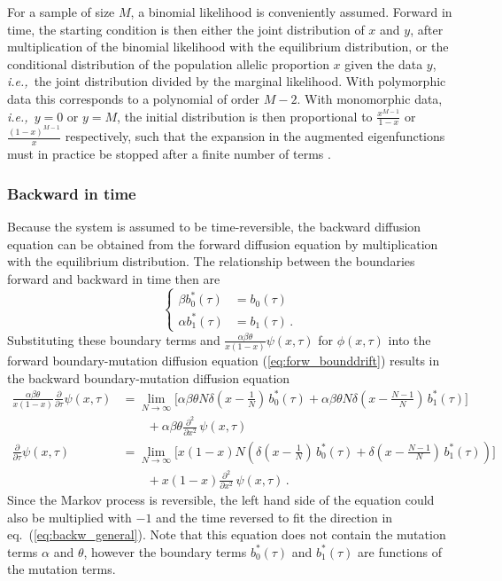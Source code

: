 \documentclass[preprint]{elsarticle}
\newcommand\ie{{\it i.e.,}}
\begin{document}
For a sample of size $M$, a binomial likelihood is conveniently assumed. Forward in time, the starting condition is then either the joint distribution of $x$ and $y$, after multiplication of the binomial likelihood with the equilibrium distribution, or the conditional distribution of the population allelic proportion $x$ given the data $y$, \ie\ the joint distribution divided by the marginal likelihood. With polymorphic data this corresponds to a polynomial of order $M-2$. With monomorphic data, \ie\ $y=0$ or $y=M$, the initial distribution is then proportional to $\frac{x^{M-1}}{1-x}$ or $\frac{(1-x)^{M-1}}{x}$ respectively, such that the expansion in the augmented eigenfunctions must in practice be stopped after a finite number of terms \citep{Vogl16}.

\subsubsection{Backward in time}

Because the system is assumed to be time-reversible, the backward diffusion equation can be obtained from the forward diffusion equation by multiplication with the equilibrium distribution. The relationship between the boundaries forward and backward in time then are
\begin{equation}
\begin{cases}
\beta b_0^{*}(\tau)&= b_0(\tau)\\ 
\alpha b_1^{*}(\tau)&=b_1(\tau)\,.
\end{cases}
\end{equation}
Substituting these boundary terms and  $\tfrac{\alpha\beta\theta}{x(1-x)}\psi(x,\tau)$ for $\phi(x,\tau)$ into the forward boundary-mutation diffusion equation (\ref{eq:forw_bounddrift}) results in the backward boundary-mutation diffusion equation
\begin{equation}\label{eq:back_bounddrift}
\begin{split}
\frac{\alpha\beta\theta}{x(1-x)}\frac{\partial}{\partial \tau} \psi(x,\tau)&=
     \lim_{N\to\infty}\bigg[{\alpha\beta\theta}N\delta(x-\tfrac1N)\,b_0^{*}(\tau)  
    +{\alpha\beta\theta}N\delta(x-\tfrac{N-1}N) \,b_1^{*}(\tau)\bigg]\\
    &\qquad+{\alpha\beta\theta}\frac{\partial^2}{\partial x^2}\,\psi(x,\tau)\\
\frac{\partial}{\partial \tau} \psi(x,\tau)&=
     \lim_{N\to\infty}\bigg[x(1-x)N\left(\delta(x-\tfrac1N)\,b_0^{*}(\tau) +\delta(x-\tfrac{N-1}N) \,b_1^{*}(\tau)\right)\bigg]\\
    &\qquad+x(1-x)\frac{\partial^2}{\partial x^2}\,\psi(x,\tau)\,.
\end{split}
\end{equation}
Since the Markov process is reversible, the left hand side of the equation could also be multiplied with $-1$ and the time reversed to fit the direction in eq.~(\ref{eq:backw_general}). Note that this equation does not contain the mutation terms $\alpha$ and $\theta$, however the boundary terms $b_0^{*}(\tau)$ and $b_1^{*}(\tau)$ are functions of the mutation terms. 
\end{document}
